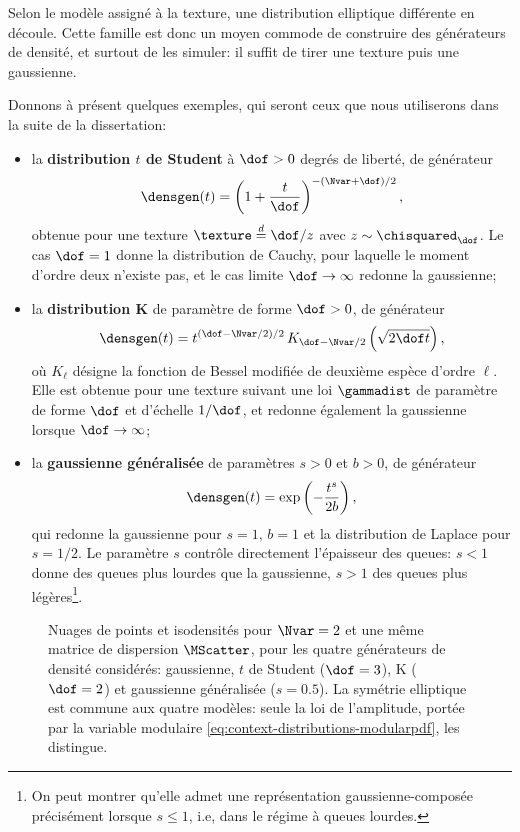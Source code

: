 \begin{remark}
  Selon le modèle assigné à la texture, une distribution elliptique différente en découle. Cette famille est donc un moyen commode de construire des générateurs de densité, et surtout de les simuler: il suffit de tirer une texture puis une gaussienne.
\end{remark}

Donnons à présent quelques exemples, qui seront ceux que nous utiliserons dans la suite de la dissertation:

\begin{itemize}
  \item la \textbf{distribution $t$ de Student} à $\dof>0$ degrés de liberté, de générateur
  $$
  \densgen(t) = \left(1+\frac{t}{\dof}\right)^{-(\Nvar+\dof)/2},
  $$
  obtenue pour une texture $\texture\overset{d}{=}\dof/z$ avec $z\sim\chisquared_\dof$. Le cas $\dof=1$ donne la distribution de Cauchy, pour laquelle le moment d'ordre deux n'existe pas, et le cas limite $\dof\to\infty$ redonne la gaussienne;

  \item la \textbf{distribution K} de paramètre de forme $\dof>0$, de générateur
  $$
  \densgen(t) = t^{(\dof-\Nvar/2)/2}\,K_{\dof-\Nvar/2}\left(\sqrt{2\dof t}\right),
  $$
  où $K_\ell$ désigne la fonction de Bessel modifiée de deuxième espèce d'ordre $\ell$. Elle est obtenue pour une texture suivant une loi $\gammadist$ de paramètre de forme $\dof$ et d'échelle $1/\dof$, et redonne également la gaussienne lorsque $\dof\to\infty$;

  \item la \textbf{gaussienne généralisée} de paramètres $s>0$ et $b>0$, de générateur
  $$
  \densgen(t) = \exp\left(-\frac{t^s}{2b}\right),
  $$
  qui redonne la gaussienne pour $s=1,\,b=1$ et la distribution de Laplace pour $s=1/2$. Le paramètre $s$ contrôle directement l'épaisseur des queues: $s<1$ donne des queues plus lourdes que la gaussienne, $s>1$ des queues plus légères\footnote{On peut montrer qu'elle admet une représentation gaussienne-composée précisément lorsque $s\leq 1$, i.e, dans le régime à queues lourdes.}.
\end{itemize}

\begin{figure}[h]
  \begin{center}
    
  \end{center}
  \provEllipticaltailsQR[.5cm]
  \caption{Nuages de points et isodensités pour $\Nvar=2$ et une même matrice de dispersion $\MScatter$, pour les quatre générateurs de densité considérés: gaussienne, $t$ de Student ($\dof=3$), K ($\dof=2$) et gaussienne généralisée ($s=0.5$). La symétrie elliptique est commune aux quatre modèles: seule la loi de l'amplitude, portée par la variable modulaire \cref{eq:context-distributions-modularpdf}, les distingue. \provEllipticaltails}
  \label{fig:context-distributions-ellipticaltails}
\end{figure}

